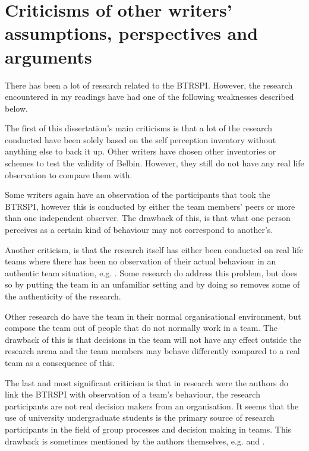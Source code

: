 \documentclass[a4paper,12pt,titlepage]{report}
\begin{document}
  \section{Criticisms of other writers' assumptions, perspectives and arguments}
  There has been a lot of research related to the BTRSPI.
  However, the research encountered in my readings have had one of the
  following weaknesses described below.

  The first of this dissertation's main criticisms is that a lot of the research
  conducted have been solely based on the self perception inventory without anything
  else to back it up. Other writers have chosen other inventories or schemes to
  test the validity of Belbin. However, they still do not have any real life
  observation to compare them with.

  Some writers again have an observation of the participants that took the
  BTRSPI, however this is conducted by either the team members' peers or
  more than one independent observer.
  The drawback of this, is that what one person perceives
  as a certain kind of behaviour may not correspond to another's.

  Another criticism, is that the research itself has either been
  conducted on real life teams where there has been no observation of their
  actual behaviour in an authentic team situation, e.g. \citet{kg}.
  Some research do address this problem, but does so by putting the
  team in an unfamiliar setting and by doing so removes some of the authenticity of
  the research.

  Other research do have the team in their normal organisational environment, but
  compose the team out of people that do not normally work in a team. The drawback
  of this is that decisions in the team will not have any effect outside
  the research arena and the team members may behave differently compared
  to a real team as a consequence of this. 

  The last and most significant criticism is that in research were
  the authors do link the BTRSPI with observation of a team's behaviour,
  the research participants are not real decision makers from an organisation.
  It seems that the use of university undergraduate students is
  the primary source of research participants
  in the field of group processes and decision making in teams. This drawback is
  sometimes mentioned by the authors themselves, e.g. \citet[14]{sfwm}
  and \citet[419]{nlrskk}.
\end{document}
